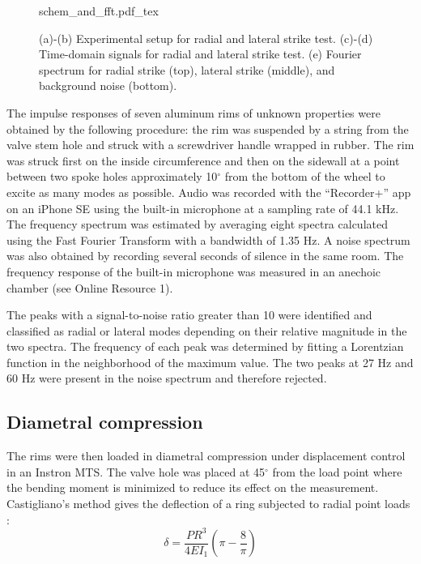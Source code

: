 \documentclass[../thesis.tex]{subfiles}
\begin{document}
\begin{figure}
\centering
{}
{schem_and_fft.pdf_tex}
\caption{(a)-(b) Experimental setup for radial and lateral strike test. (c)-(d) Time-domain signals for radial and lateral strike test. (e) Fourier spectrum for radial strike (top), lateral strike (middle), and background noise (bottom).}
\label{fig:schem}
\end{figure}

The impulse responses of seven aluminum rims of unknown properties were obtained by the following procedure: the rim was suspended by a string from the valve stem hole and struck with a screwdriver handle wrapped in rubber. The rim was struck first on the inside circumference and then on the sidewall at a point between two spoke holes approximately 10$^{\circ}$ from the bottom of the wheel to excite as many modes as possible. Audio was recorded with the ``Recorder+'' app on an iPhone SE using the built-in microphone at a sampling rate of 44.1 kHz. The frequency spectrum was estimated by averaging eight spectra calculated using the Fast Fourier Transform with a bandwidth of 1.35 Hz. A noise spectrum was also obtained by recording several seconds of silence in the same room. The frequency response of the built-in microphone was measured in an anechoic chamber (see Online Resource 1).

The peaks with a signal-to-noise ratio greater than 10 were identified and classified as radial or lateral modes depending on their relative magnitude in the two spectra. The frequency of each peak was determined by fitting a Lorentzian function in the neighborhood of the maximum value. The two peaks at 27 Hz and 60 Hz were present in the noise spectrum and therefore rejected.

\subsection{Diametral compression}
The rims were then loaded in diametral compression under displacement control in an Instron MTS. The valve hole was placed at 45$^{\circ}$ from the load point where the bending moment is minimized to reduce its effect on the measurement. Castigliano's method gives the deflection of a ring subjected to radial point loads \cite{Timoshenko1961a}:
  \begin{equation}\label{eq:def_rad}
  \delta = \frac{PR^3}{4EI_1} \left(\pi-\frac{8}{\pi} \right)
  \end{equation}
\end{document}
